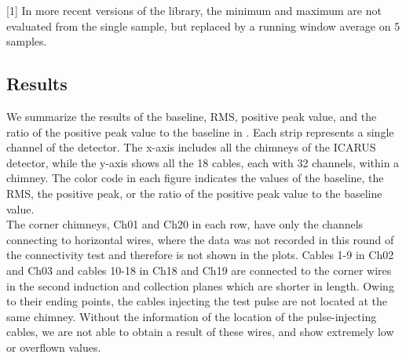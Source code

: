 {[}1{]} In more recent versions of the library, the minimum and maximum
are not evaluated from the single sample, but replaced by a running
window average on 5 samples.


\subsection{Results}
\label{sec:results}

We summarize the results of the baseline, RMS, positive peak value, 
and the ratio of the positive peak value to the baseline in 
.
Each strip represents a single channel of the detector.
The x-axis includes all the chimneys of the ICARUS detector, while
the y-axis shows all the 18 cables, each with 32 channels, within a chimney.
The color code in each figure indicates the values of the baseline, the RMS,
the positive peak, or the ratio of the positive peak value to
the baseline value.\\

The corner chimneys, Ch01 and Ch20 in each row, have only the channels
connecting to horizontal wires, where the data was not recorded in this
round of the connectivity test and therefore is not shown in the plots.
Cables 1-9 in Ch02 and Ch03 and cables 10-18 in Ch18 and Ch19 are connected
to the corner wires in the second induction and collection planes which are
shorter in length.
Owing to their ending points, the cables injecting the test pulse are
not located at the same chimney.
Without the information of the location of the pulse-injecting cables,
we are not able to obtain a result of these wires, and 
 show extremely low or
overflown values.\\


